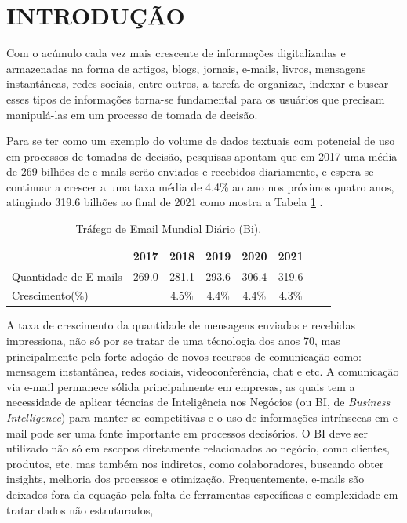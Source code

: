 \documentclass[12pt,a4paper]{article}
\begin{document}

\newpage
\thispagestyle{empty}
\tableofcontents

\newpage
\pagestyle{plain}
\renewcommand{\baselinestretch}{1.5}
\normalsize
\section{INTRODUÇÃO} \label{sec:introducao}
 
 Com o acúmulo cada vez mais crescente de informações digitalizadas e armazenadas na forma de artigos, blogs, jornais, e-mails, livros, mensagens instantâneas, redes sociais, entre outros, 
 a tarefa de organizar, indexar e buscar esses tipos de informações torna-se fundamental para os usuários que precisam manipulá-las em um processo de tomada de decisão. 
 
 Para se ter como um exemplo do volume de dados textuais com potencial de uso em processos de tomadas de decisão, pesquisas apontam que em 2017 uma média de 269 bilhões de e-mails serão enviados e recebidos diariamente, e espera-se continuar a crescer a uma taxa média de 4.4\% ao ano nos próximos quatro anos, atingindo 319.6 bilhões ao final de 2021 como mostra a Tabela \ref{tb_email} \cite{radicati2017}.

\begin{table}[H]
  \centering
  \begin{tabular}{l*{6}{c}r}
  &					2017 &	2018 &	2019 &	2020 &	2021 & \\
  \hline
  Quantidade de E-mails &			269.0 &	281.1 &	293.6 &	306.4 &	319.6 & \\
  Crescimento(\%) &  	&		4.5\% &	4.4\% &	4.4\% &	4.3\% & \\
  \hline
  \end{tabular}
  \caption{Tráfego de Email Mundial Diário  (Bi). \cite{radicati2017}}
  \label{tb_email}
\end{table}

A taxa de crescimento da quantidade de mensagens enviadas e recebidas impressiona, não só por se tratar de uma técnologia dos anos 70,
mas principalmente pela forte adoção de novos recursos de comunicação como: mensagem instantânea, redes sociais, videoconferência, chat e etc. A comunicação via e-mail permanece sólida principalmente em empresas, as quais tem a necessidade de aplicar técncias de Inteligência nos Negócios (ou BI, de \textit{Business Intelligence}) para manter-se competitivas e o uso de informações intrínsecas em e-mail pode ser uma fonte importante em processos decisórios. O BI deve ser utilizado não só em escopos diretamente relacionados ao negócio,
como clientes, produtos, etc. mas também nos indiretos, como colaboradores, buscando obter insights, melhoria dos processos e otimização.
Frequentemente, e-mails são deixados fora da equação pela falta de ferramentas específicas e complexidade em tratar dados não estruturados,
 
\end{document}
